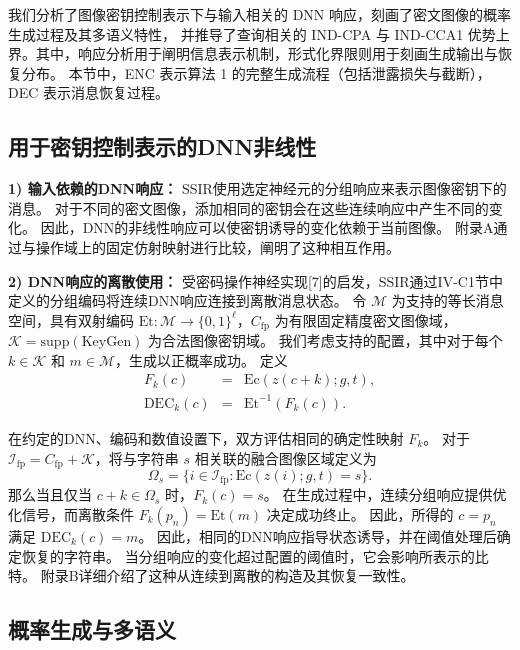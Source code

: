 我们分析了图像密钥控制表示下与输入相关的 DNN 响应，刻画了密文图像的概率生成过程及其多语义特性，
并推导了查询相关的 IND-CPA 与 IND-CCA1 优势上界。其中，响应分析用于阐明信息表示机制，形式化界限则用于刻画生成输出与恢复分布。
本节中，ENC 表示算法 1 的完整生成流程（包括泄露损失与截断），DEC 表示消息恢复过程。
\subsection*{用于密钥控制表示的DNN非线性}
\textbf{1) 输入依赖的DNN响应：}
SSIR使用选定神经元的分组响应来表示图像密钥下的消息。
对于不同的密文图像，添加相同的密钥会在这些连续响应中产生不同的变化。
因此，DNN的非线性响应可以使密钥诱导的变化依赖于当前图像。
附录A通过与操作域上的固定仿射映射进行比较，阐明了这种相互作用。

\textbf{2) DNN响应的离散使用：}
受密码操作神经实现[7]的启发，SSIR通过IV-C1节中定义的分组编码将连续DNN响应连接到离散消息状态。
令 \(\mathcal{M}\) 为支持的等长消息空间，具有双射编码 \(\mathrm{Et} : \mathcal{M} \to \{0,1\}^\ell\)，\(C_{\mathrm{fp}}\) 为有限固定精度密文图像域，\(\mathcal{K} = \mathrm{supp}(\mathrm{KeyGen})\) 为合法图像密钥域。
我们考虑支持的配置，其中对于每个 \(k \in \mathcal{K}\) 和 \(m \in \mathcal{M}\)，生成以正概率成功。
定义
\begin{equation}
\begin{array}{rcl}
F_k(c) &=& \mathrm{Ec}(z(c+k); g, t), \\
\mathrm{DEC}_k(c) &=& \mathrm{Et}^{-1}(F_k(c)).
\end{array}
\end{equation}

在约定的DNN、编码和数值设置下，双方评估相同的确定性映射 \(F_k\)。
对于 \(\mathcal{I}_{\mathrm{fp}} = C_{\mathrm{fp}} + \mathcal{K}\)，将与字符串 \(s\) 相关联的融合图像区域定义为
\begin{equation}
\Omega_s = \{ i \in \mathcal{I}_{\mathrm{fp}} : \mathrm{Ec}(z(i); g, t) = s \}.
\end{equation}
那么当且仅当 \(c + k \in \Omega_s\) 时，\(F_k(c) = s\)。
在生成过程中，连续分组响应提供优化信号，而离散条件 \(F_k(p_n) = \mathrm{Et}(m)\) 决定成功终止。
因此，所得的 \(c = p_n\) 满足 \(\mathrm{DEC}_k(c) = m\)。
因此，相同的DNN响应指导状态诱导，并在阈值处理后确定恢复的字符串。
当分组响应的变化超过配置的阈值时，它会影响所表示的比特。
附录B详细介绍了这种从连续到离散的构造及其恢复一致性。

\subsection*{概率生成与多语义}

